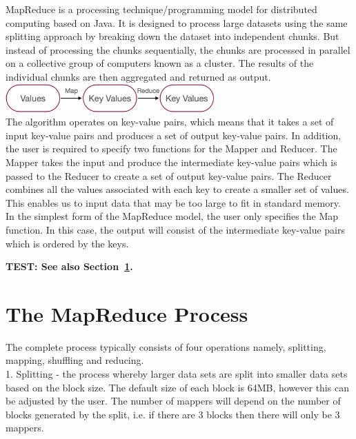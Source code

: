 \documentclass[11pt]{book}
\begin{document}
MapReduce is a processing technique/programming model for distributed computing based on Java. It is designed to process large datasets using the same splitting approach by breaking down the dataset into independent chunks. But instead of processing the chunks sequentially, the chunks are processed in parallel on a collective group of computers known as a cluster. The results of the individual chunks are then aggregated and returned as output.\\

\includegraphics[width=8cm]{keyvalue} \\

The algorithm operates on key-value pairs, which means that it takes a set of input key-value pairs and produces a set of output key-value pairs. In addition, the user is required to specify two functions for the Mapper and Reducer. The Mapper takes the input and produce the intermediate key-value pairs which is passed to the Reducer to create a set of output key-value pairs. The Reducer combines all the values associated with each key to create a smaller set of values. This enables us to input data that may be too large to fit in standard memory.\\

In the simplest form of the MapReduce model, the user only specifies the Map function. In this case, the output will consist of the intermediate key-value pairs which is ordered by the keys. 

{\bf TEST: 
See also Section~\ref{sec:mapreduce}. }

\section{The MapReduce Process}
\label{sec:mapreduce}

The complete process typically consists of four operations namely, splitting, mapping, shuffling and reducing.\\

1. Splitting - the process whereby larger data sets are split into smaller data sets based on the block size. The default size of each block is 64MB, however this can be adjusted by the user. The number of mappers will depend on the number of blocks generated by the split, i.e. if there are 3 blocks then there will only be 3 mappers.\\
\end{document}
